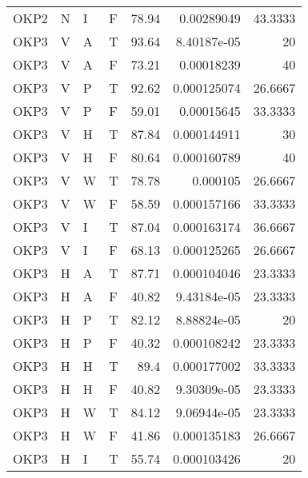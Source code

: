 \begin{longtable}{llllrrr}
    OKP2     & N         & I         & F          & 78.94      & 0.00289049  & 43.3333  \\
    OKP3     & V         & A         & T          & 93.64      & 8.40187e-05 & 20       \\
    OKP3     & V         & A         & F          & 73.21      & 0.00018239  & 40       \\
    OKP3     & V         & P         & T          & 92.62      & 0.000125074 & 26.6667  \\
    OKP3     & V         & P         & F          & 59.01      & 0.00015645  & 33.3333  \\
    OKP3     & V         & H         & T          & 87.84      & 0.000144911 & 30       \\
    OKP3     & V         & H         & F          & 80.64      & 0.000160789 & 40       \\
    OKP3     & V         & W         & T          & 78.78      & 0.000105    & 26.6667  \\
    OKP3     & V         & W         & F          & 58.59      & 0.000157166 & 33.3333  \\
    OKP3     & V         & I         & T          & 87.04      & 0.000163174 & 36.6667  \\
    OKP3     & V         & I         & F          & 68.13      & 0.000125265 & 26.6667  \\
    OKP3     & H         & A         & T          & 87.71      & 0.000104046 & 23.3333  \\
    OKP3     & H         & A         & F          & 40.82      & 9.43184e-05 & 23.3333  \\
    OKP3     & H         & P         & T          & 82.12      & 8.88824e-05 & 20       \\
    OKP3     & H         & P         & F          & 40.32      & 0.000108242 & 23.3333  \\
    OKP3     & H         & H         & T          & 89.4       & 0.000177002 & 33.3333  \\
    OKP3     & H         & H         & F          & 40.82      & 9.30309e-05 & 23.3333  \\
    OKP3     & H         & W         & T          & 84.12      & 9.06944e-05 & 23.3333  \\
    OKP3     & H         & W         & F          & 41.86      & 0.000135183 & 26.6667  \\
    OKP3     & H         & I         & T          & 55.74      & 0.000103426 & 20       \\

\end{longtable}
